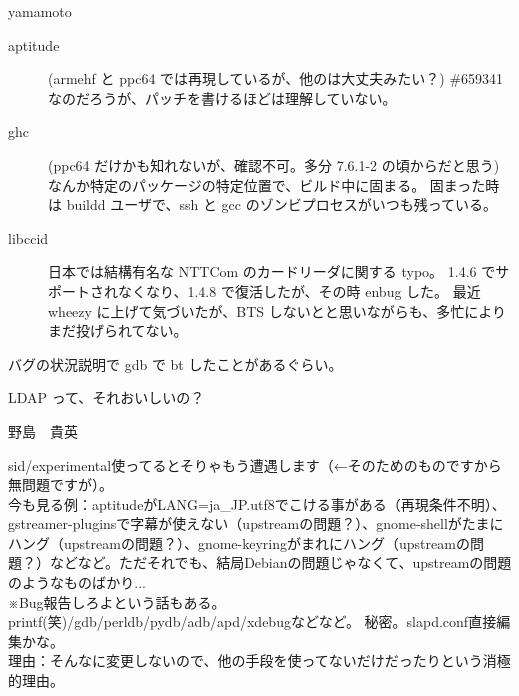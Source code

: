 \begin{prework}{ yamamoto }


\begin{description}
\item [aptitude] (armehf と ppc64 では再現しているが、他のは大丈夫みたい？)
\#659341 なのだろうが、パッチを書けるほどは理解していない。

\item [ghc] (ppc64 だけかも知れないが、確認不可。多分 7.6.1-2 の頃からだと思う)
なんか特定のパッケージの特定位置で、ビルド中に固まる。
固まった時は buildd ユーザで、ssh と gcc のゾンビプロセスがいつも残っている。

\item [libccid] 日本では結構有名な NTTCom のカードリーダに関する typo。
1.4.6 でサポートされなくなり、1.4.8 で復活したが、その時 enbug した。
最近 wheezy に上げて気づいたが、BTS しないとと思いながらも、多忙によりまだ投げられてない。
\end{description}

バグの状況説明で gdb で bt したことがあるぐらい。

LDAP って、それおいしいの？
\end{prework}

\begin{prework}{ 野島　貴英 }

sid/experimental使ってるとそりゃもう遭遇します（←そのためのものですから無問題ですが）。\\
今も見る例：aptitudeがLANG=ja\_JP.utf8でこける事がある（再現条件不明）、gstreamer-pluginsで字幕が使えない（upstreamの問題？）、gnome-shellがたまにハング（upstreamの問題？）、gnome-keyringがまれにハング（upstreamの問題？）などなど。ただそれでも、結局Debianの問題じゃなくて、upstreamの問題のようなものばかり...\\
※Bug報告しろよという話もある。
printf(笑)/gdb/perldb/pydb/adb/apd/xdebugなどなど。
 秘密。slapd.conf直接編集かな。\\
理由：そんなに変更しないので、他の手段を使ってないだけだったりという消極的理由。
\end{prework}

